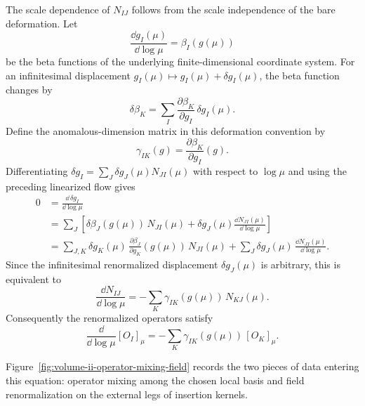The scale dependence of \(N_{IJ}\) follows from the scale independence of the
bare deformation.  Let
\[
  \frac{\dd g_I(\mu)}{\dd\log\mu}
  =
  \beta_I(g(\mu))
\]
be the beta functions of the underlying finite-dimensional coordinate system.
For an infinitesimal displacement \(g_I(\mu)\mapsto g_I(\mu)+\delta g_I(\mu)\),
the beta function changes by
\[
  \delta\beta_K
  =
  \sum_I
  \frac{\partial\beta_K}{\partial g_I}\,\delta g_I(\mu).
\]
Define the anomalous-dimension matrix in this deformation convention by
\[
  \gamma_{IK}(g)
  =
  \frac{\partial\beta_K}{\partial g_I}(g).
\]
Differentiating
\(\delta g_I=\sum_J\delta g_J(\mu)N_{JI}(\mu)\) with respect to
\(\log\mu\) and using the preceding linearized flow gives
\[
\begin{aligned}
  0
  &=
  \frac{\dd\,\delta g_I}{\dd\log\mu}                                      \\
  &=
  \sum_J
  \left[
    \delta\beta_J(g(\mu))\,N_{JI}(\mu)
    +
    \delta g_J(\mu)
    \frac{\dd N_{JI}(\mu)}{\dd\log\mu}
  \right]                                                                  \\
  &=
  \sum_{J,K}
  \delta g_K(\mu)\,
  \frac{\partial\beta_J}{\partial g_K}(g(\mu))\,N_{JI}(\mu)
  +
  \sum_J
  \delta g_J(\mu)\,
  \frac{\dd N_{JI}(\mu)}{\dd\log\mu}.
\end{aligned}
\]
Since the infinitesimal renormalized displacement \(\delta g_J(\mu)\) is
arbitrary, this is equivalent to
\[
  \frac{\dd N_{IJ}}{\dd\log\mu}
  =
  -\sum_K \gamma_{IK}(g(\mu))\,N_{KJ}(\mu).
\]
Consequently the renormalized operators satisfy
\[
  \frac{\dd}{\dd\log\mu}[O_I]_\mu
  =
  -\sum_K\gamma_{IK}(g(\mu))\,[O_K]_\mu .
\]

Figure~\ref{fig:volume-ii-operator-mixing-field} records the two pieces of data
entering this equation: operator mixing among the chosen local basis and field
renormalization on the external legs of insertion kernels.

